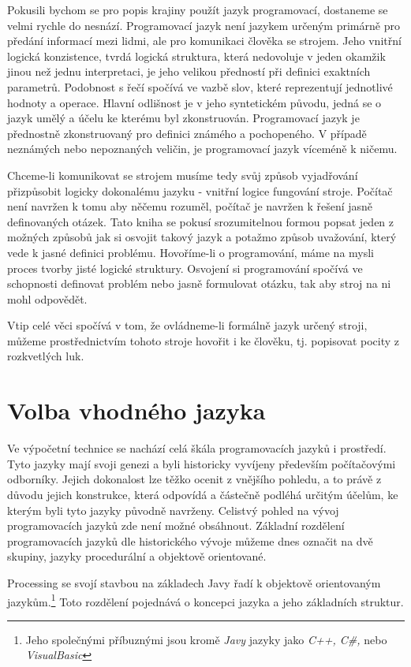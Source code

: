 \documentclass[11pt]{book}
\newcommand{\oddil}[1]{\section{#1}\label{sec:#1}}
\begin{document}
Pokusili bychom se pro popis krajiny použít jazyk programovací, dostaneme se velmi rychle do nesnází. Programovací jazyk není jazykem určeným primárně pro předání informací mezi lidmi, ale pro komunikaci člověka se strojem. Jeho vnitřní logická konzistence, tvrdá logická struktura, která nedovoluje v jeden okamžik jinou než jednu interpretaci, je jeho velikou předností při definici exaktních parametrů. Podobnost s řečí spočívá ve vazbě slov, které reprezentují jednotlivé hodnoty a operace. Hlavní odlišnost je v jeho syntetickém původu, jedná se o jazyk umělý a účelu ke kterému byl zkonstruován. Programovací jazyk je přednostně zkonstruovaný pro definici známého a pochopeného. V případě neznámých nebo nepoznaných veličin, je programovací jazyk víceméně k ničemu. 

Chceme-li komunikovat se strojem musíme tedy svůj způsob vyjadřování přizpůsobit logicky dokonalému jazyku - vnitřní logice fungování stroje. Počítač není navržen k tomu aby něčemu rozuměl, počítač je navržen k řešení jasně definovaných otázek. Tato kniha se pokusí srozumitelnou formou popsat jeden z možných způsobů jak si osvojit takový jazyk a potažmo způsob uvažování, který vede k jasné definici problému. Hovoříme-li o programování, máme na mysli proces tvorby jisté logické struktury. Osvojení si programování spočívá ve schopnosti definovat problém nebo jasně formulovat otázku, tak aby stroj na ni mohl odpovědět.

Vtip celé věci spočívá v tom, že ovládneme-li formálně jazyk určený stroji, můžeme prostřednictvím tohoto stroje hovořit i ke člověku, tj. popisovat pocity z rozkvetlých luk.

\oddil{Volba vhodného jazyka}


Ve výpočetní technice se nachází celá škála programovacích jazyků i prostředí. Tyto jazyky mají svoji genezi a byli historicky vyvíjeny především počítačovými odborníky. Jejich dokonalost lze těžko ocenit z vnějšího pohledu, a to právě z důvodu jejich konstrukce, která odpovídá a částečně podléhá určitým účelům, ke kterým byli tyto jazyky původně navrženy. Celistvý pohled na vývoj programovacích jazyků zde není možné obsáhnout. Základní rozdělení programovacích jazyků dle historického vývoje můžeme dnes označit na dvě skupiny, jazyky procedurální a objektově orientované.

Processing se svojí stavbou na základech Javy řadí k objektově orientovaným jazykům.\footnote{ Jeho společnými příbuznými jsou kromě {\em Javy} jazyky jako {\em C++, C\#,} nebo {\em VisualBasic}} Toto rozdělení pojednává o koncepci jazyka a jeho základních struktur. 
\end{document}
